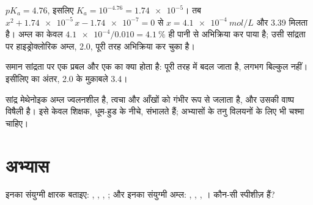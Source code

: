 \begin{example}\label{ex:g12:ka-and-pka:acetic}
$pK_a = 4.76$, इसलिए $K_a = 10^{-4.76} = \num{1.74e-5}$। तब
$x^2 + \num{1.74e-5}\,x - \num{1.74e-7} = 0$ से
$x = \qty{4.1e-4}{mol/L}$ और  3.39 मिलता है। अम्ल का केवल $\num{4.1e-4}/0.010 =
\qty{4.1}{\percent}$ ही पानी से अभिक्रिया कर पाया है; उसी सांद्रता पर
हाइड्रोक्लोरिक अम्ल,  2.0, पूरी तरह अभिक्रिया कर चुका है।
\end{example}

\begin{omfigure}

{\small समान सांद्रता पर एक प्रबल और एक  का क्या होता है:
 पूरी तरह  में बदल जाता है,  लगभग बिल्कुल नहीं। इसीलिए  का अंतर, 2.0 के मुक़ाबले 3.4।}
\end{omfigure}

\begin{safety}{}
सांद्र मेथेनोइक अम्ल ज्वलनशील है, त्वचा और आँखों को गंभीर रूप से
जलाता है, और उसकी वाष्प विषैली है। इसे केवल शिक्षक,
धूम-हुड के नीचे, संभालते हैं; अभ्यासों के तनु विलयनों के लिए भी
चश्मा चाहिए।
\end{safety}

\section{अभ्यास}

\begin{exercise}[$\star$]\label{exo:g12:ka-and-pka:1}
इनका संयुग्मी क्षारक बताइए: , , , ;
और इनका संयुग्मी अम्ल: , , , ।
कौन-सी स्पीशीज़  हैं?
\end{exercise}

